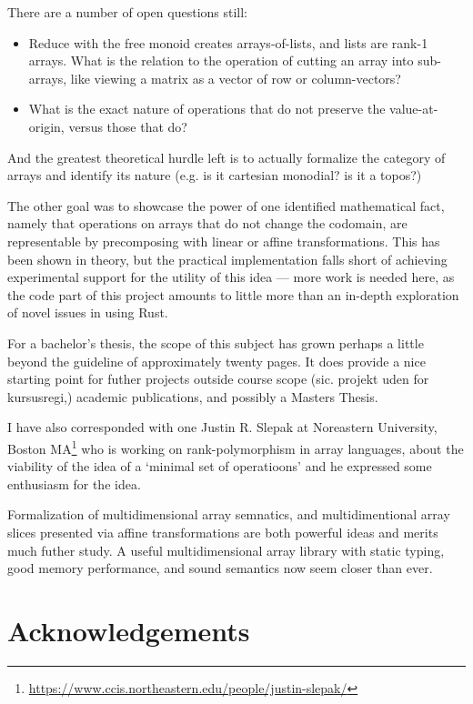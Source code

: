 \documentclass{DIKU-report-variant}
\begin{document}
There are a number of open questions still:
\begin{itemize}
  \item Reduce with the free monoid creates arrays-of-lists, and lists are rank-1 arrays. What
    is the relation to the operation of cutting an array into sub-arrays, like viewing a matrix
    as a vector of row or column-vectors?
  \item What is the exact nature of operations that do not preserve the value-at-origin,
    versus those that do?
\end{itemize}

And the greatest theoretical hurdle left is to actually formalize the category of arrays
and identify its nature (e.g. is it cartesian monodial? is it a topos?)

The other goal was to showcase the power of one identified mathematical fact, namely that
operations on arrays that do not change the codomain, are representable by precomposing with
linear or affine transformations. This has been shown in theory, but the practical implementation
falls short of achieving experimental support for the utility of this idea --- more work is needed
here, as the code part of this project amounts to little more than
an in-depth exploration of novel issues in using Rust.

For a bachelor's thesis, the scope of this subject has grown perhaps a little beyond the guideline
of approximately twenty pages. It does provide a nice starting point for futher projects outside
course scope (sic. projekt uden for kursusregi,) academic publications, and possibly a Masters Thesis.

I have also corresponded with one Justin R. Slepak at Noreastern University,
Boston MA\footnote{\url{https://www.ccis.northeastern.edu/people/justin-slepak/}} who is
working on rank-polymorphism in array languages, about the viability of the idea of a `minimal set of
operatioons' and he expressed some enthusiasm for the idea.

Formalization of multidimensional array semnatics, and multidimentional array slices presented via
affine transformations are both powerful ideas and merits much futher study. A useful multidimensional
array library with static typing, good memory performance, and sound semantics now seem closer than
ever.

\section{Acknowledgements}
\end{document}
